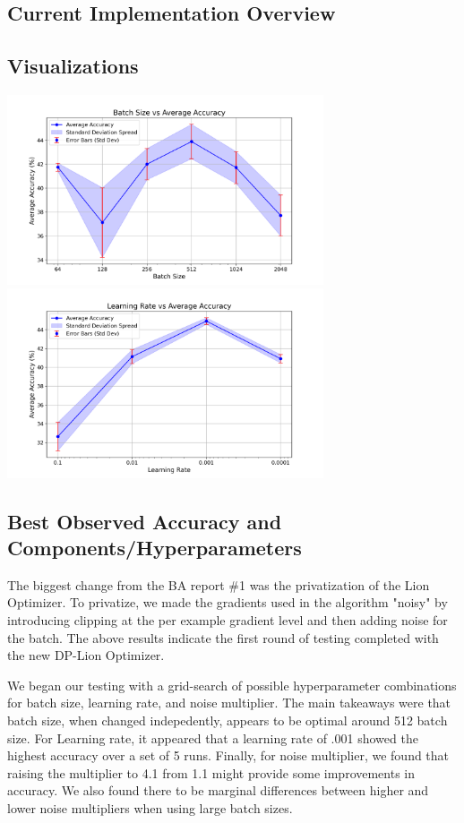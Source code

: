 \subsection{Current Implementation Overview}\label{subsec:current-implementation2}


\subsection{Visualizations}\label{subsec:best-accuracy-viz2}
\includegraphics[width=0.7\textwidth]{batch_size_vs_accuracy.png}
\includegraphics[width=0.7\textwidth]{learning_rate_vs_accuracy.png}

\subsection{Best Observed Accuracy and Components/Hyperparameters}\label{subsec:best-accuracy2}
The biggest change from the BA report \#1 was the privatization of the Lion Optimizer. To privatize, we made the gradients used in the algorithm "noisy" by introducing clipping
at the per example gradient level and then adding noise for the batch. The above results indicate the first round of testing completed with the new DP-Lion Optimizer.

We began our testing with a grid-search of possible hyperparameter combinations for batch size, learning rate, and noise multiplier. The main takeaways were that batch size,
when changed indepedently, appears to be optimal around 512 batch size. For Learning rate, it appeared that a learning rate of .001 showed the highest accuracy over a set of 5
runs. Finally, for noise multiplier, we found that raising the multiplier to 4.1 from 1.1 might provide some improvements in accuracy. We also found there to be marginal differences
between higher and lower noise multipliers when using large batch sizes.

